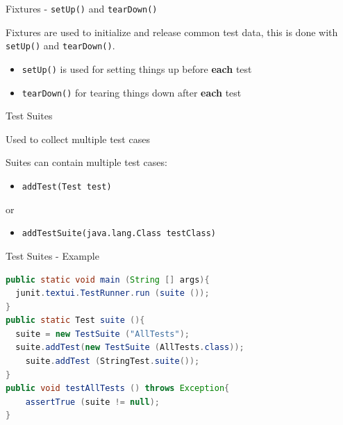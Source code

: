 \documentclass[11pt, xcolor=svgnames]{beamer}
\begin{document}
\begin{frame}{Fixtures - \texttt{setUp()} and \texttt{tearDown()}}

Fixtures are used to initialize and release common test data, this is done with \texttt{setUp()} and \texttt{tearDown()}.


\begin{itemize}
  \item \texttt{setUp()} is used for setting things up before \textbf{each} test
  \item \texttt{tearDown()} for tearing things down after \textbf{each} test
\end{itemize}

\end{frame}




\begin{frame}[fragile]{Test Suites}

Used to collect multiple test cases

Suites can contain multiple test cases: 

\begin{itemize}
 \item \texttt{addTest(Test test)}
\end{itemize}

or

\begin{itemize}
 \item \texttt{addTestSuite(java.lang.Class testClass)}
\end{itemize}


\end{frame}



\begin{frame}[fragile]{Test Suites - Example}

\begin{lstlisting}[language=JAVA,basicstyle=\scriptsize]
public static void main (String [] args){
  junit.textui.TestRunner.run (suite ());
}
public static Test suite (){
  suite = new TestSuite ("AllTests");
  suite.addTest(new TestSuite (AllTests.class));
    suite.addTest (StringTest.suite());
}
public void testAllTests () throws Exception{
    assertTrue (suite != null);
}
\end{lstlisting}

\end{frame}
\end{document}
